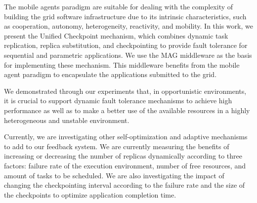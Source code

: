 \documentclass[times, 09pt, twocolumn]{article}
\begin{document}
The mobile agents paradigm are suitable for dealing with the complexity
of building the grid software infrastructure due to its intrinsic
characteristics, such as cooperation, autonomy, heterogeneity, reactivity, and
mobility. In this work, we present the Unified Checkpoint
mechanism, which combines dynamic task replication, replica substitution, and
checkpointing to provide fault tolerance for sequential and parametric
applications. We use the MAG middleware as the basis for implementing these
mechanism. This middleware benefits from the mobile agent paradigm to
encapsulate the applications submitted to the grid. 

We demonstrated through our experiments that, in opportunistic environments,
it is crucial to support dynamic fault tolerance mechanisms to
achieve high performance as well as to make a better use of the available
resources in a highly heterogeneous and unstable environment.

Currently, we are investigating other self-optimization and adaptive mechanisms
to add to our feedback system. We are currently measuring the benefits of increasing
or decreasing the number of replicas dynamically according to three factors: failure rate
of the execution environment, number of free resources, and amount of tasks to
be scheduled. We are also investigating the impact of changing the
checkpointing interval according to the failure rate and the size of the
checkpoints to optimize application completion time. 



\end{document}
